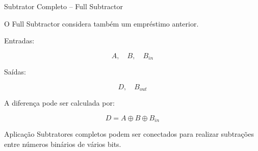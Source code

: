 \begin{frame}{Subtrator Completo -- Full Subtractor}

    O Full Subtractor considera também um empréstimo anterior.

    Entradas:

    \[
        A,\quad B,\quad B_{in}
    \]

    Saídas:

    \[
        D,\quad B_{out}
    \]

    A diferença pode ser calculada por:

    \[
        \boxed{D=A\oplus B\oplus B_{in}}
    \]

    \begin{block}{Aplicação}
        Subtratores completos podem ser conectados para realizar
        subtrações entre números binários de vários bits.
    \end{block}

\end{frame}